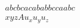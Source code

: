 \documentclass{amsart}
\begin{document}
\thispagestyle{empty}

\begin{align*}
abc bca cab ab bc ca a b c \\
x y z A u_x u_y u_z
\end{align*}
\end{document}
